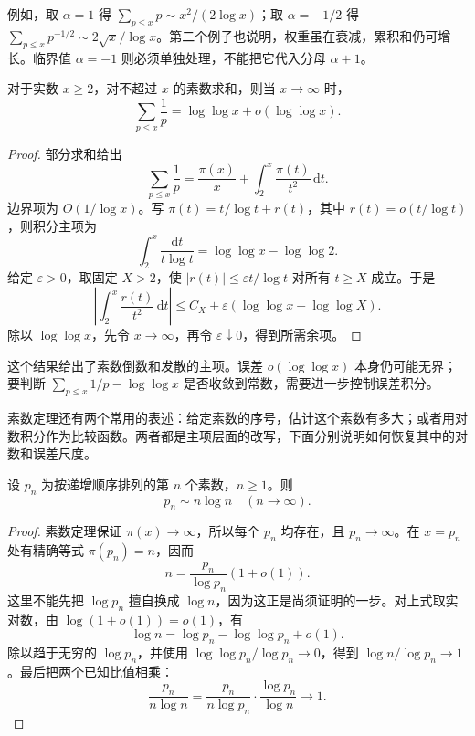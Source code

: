 例如，取 \(\alpha=1\) 得 \(\sum_{p\le x}p\sim x^2/(2\log x)\)；取 \(\alpha=-1/2\) 得 \(\sum_{p\le x}p^{-1/2}\sim2\sqrt x/\log x\)。第二个例子也说明，权重虽在衰减，累积和仍可增长。临界值 \(\alpha=-1\) 则必须单独处理，不能把它代入分母 \(\alpha+1\)。

\begin{proposition}[素数倒数和的主项]
\label{b3:prop:27-prime-reciprocal-asymptotic}
对于实数 \(x\ge2\)，对不超过 \(x\) 的素数求和，则当 \(x\to\infty\) 时，
\[
 \sum_{p\le x}\frac1p=\log\log x+o(\log\log x).
\]
\end{proposition}
\begin{proof}
部分求和给出
\[
 \sum_{p\le x}\frac1p
 =\frac{\pi(x)}x+\int_2^x\frac{\pi(t)}{t^2}\,\mathrm dt.
\]
边界项为 \(O(1/\log x)\)。写 \(\pi(t)=t/\log t+r(t)\)，其中 \(r(t)=o(t/\log t)\)，则积分主项为
\[
 \int_2^x\frac{\mathrm dt}{t\log t}
 =\log\log x-\log\log2.
\]
给定 \(\varepsilon>0\)，取固定 \(X>2\)，使 \(|r(t)|\le\varepsilon t/\log t\) 对所有 \(t\ge X\) 成立。于是
\[
 \left|\int_2^x\frac{r(t)}{t^2}\,\mathrm dt\right|
 \le C_X+\varepsilon(\log\log x-\log\log X).
\]
除以 \(\log\log x\)，先令 \(x\to\infty\)，再令 \(\varepsilon\downarrow0\)，得到所需余项。
\end{proof}

这个结果给出了素数倒数和发散的主项。误差 \(o(\log\log x)\) 本身仍可能无界；要判断 \(\sum_{p\le x}1/p-\log\log x\) 是否收敛到常数，需要进一步控制误差积分。

\ProseParagraphBreak

素数定理还有两个常用的表述：给定素数的序号，估计这个素数有多大；或者用对数积分作为比较函数。两者都是主项层面的改写，下面分别说明如何恢复其中的对数和误差尺度。

\begin{corollary}
\label{b3:cor:27-nth-prime}
设 \(p_n\) 为按递增顺序排列的第 \(n\) 个素数，\(n\ge1\)。则
\[
 p_n\sim n\log n\quad(n\to\infty).
\]
\end{corollary}
\begin{proof}
素数定理保证 \(\pi(x)\to\infty\)，所以每个 \(p_n\) 均存在，且 \(p_n\to\infty\)。在 \(x=p_n\) 处有精确等式 \(\pi(p_n)=n\)，因而
\[
 n=\frac{p_n}{\log p_n}(1+o(1)).
\]
这里不能先把 \(\log p_n\) 擅自换成 \(\log n\)，因为这正是尚须证明的一步。对上式取实对数，由 \(\log(1+o(1))=o(1)\)，有
\[
 \log n=\log p_n-\log\log p_n+o(1).
\]
除以趋于无穷的 \(\log p_n\)，并使用 \(\log\log p_n/\log p_n\to0\)，得到 \(\log n/\log p_n\to1\)。最后把两个已知比值相乘：
\[
 \frac{p_n}{n\log n}
 =\frac{p_n}{n\log p_n}\cdot\frac{\log p_n}{\log n}
 \longrightarrow1.
\]
\end{proof}


